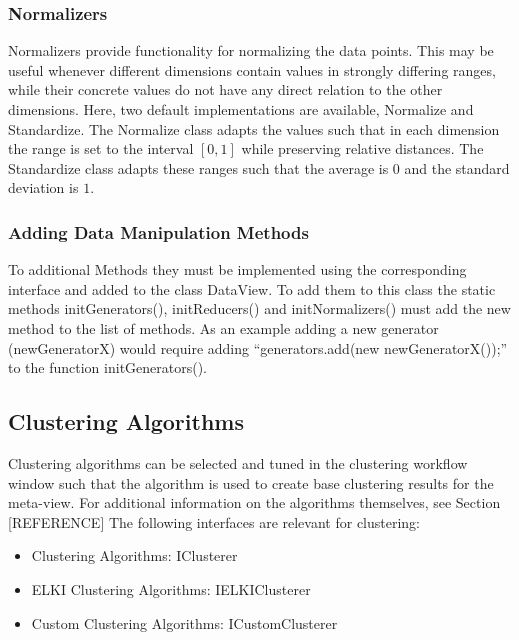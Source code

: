 \documentclass[
	a4paper,
	english,
	twoside,
	openright,               
	11pt                            
	]{report}
\begin{document}
\subsubsection{Normalizers}
Normalizers provide functionality for normalizing the data points. This may be useful whenever different dimensions contain values in strongly differing ranges, while their concrete values do not have any direct relation to the other dimensions. Here, two default implementations are available, Normalize and Standardize. The Normalize class adapts the values such that in each dimension the range is set to the interval $[0,1]$ while preserving relative distances. The Standardize class adapts these ranges such that the average is $0$ and the standard deviation is $1$.

\subsubsection*{Adding Data Manipulation Methods}
To additional Methods they must be implemented using the corresponding interface and added to the class DataView. To add them to this class the static methods initGenerators(), initReducers() and initNormalizers() must add the new method to the list of methods. As an example adding a new generator (newGeneratorX) would require adding ``generators.add(new newGeneratorX());'' to the function initGenerators().

\subsection{Clustering Algorithms}
Clustering algorithms can be selected and tuned in the clustering workflow window such that the algorithm is used to create base clustering results for the meta-view. For additional information on the algorithms themselves, see Section [REFERENCE] The following interfaces are relevant for clustering:

\begin{itemize}
  \item Clustering Algorithms: IClusterer
  \item ELKI Clustering Algorithms: IELKIClusterer
  \item Custom Clustering Algorithms: ICustomClusterer
\end{itemize}
\end{document}

